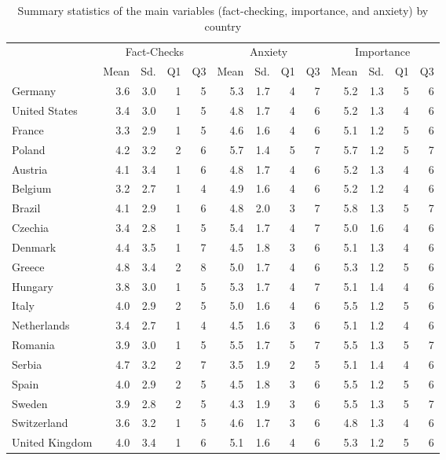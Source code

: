 \begin{table}[ht]
\centering
\begin{tabular}{lrrrrrrrrrrrr}
  \hline
  & \multicolumn{4}{c}{Fact-Checks}& \multicolumn{4}{c}{Anxiety}& \multicolumn{4}{c}{Importance}\\ & Mean & Sd. & Q1 & Q3 & Mean & Sd. & Q1 & Q3 & Mean & Sd. & Q1 & Q3 \\ \hline
Germany & 3.6 & 3.0 & 1 & 5 & 5.3 & 1.7 & 4 & 7 & 5.2 & 1.3 & 5 & 6 \\ 
  United States & 3.4 & 3.0 & 1 & 5 & 4.8 & 1.7 & 4 & 6 & 5.2 & 1.3 & 4 & 6 \\ 
  France & 3.3 & 2.9 & 1 & 5 & 4.6 & 1.6 & 4 & 6 & 5.1 & 1.2 & 5 & 6 \\ 
  Poland & 4.2 & 3.2 & 2 & 6 & 5.7 & 1.4 & 5 & 7 & 5.7 & 1.2 & 5 & 7 \\ 
  Austria & 4.1 & 3.4 & 1 & 6 & 4.8 & 1.7 & 4 & 6 & 5.2 & 1.3 & 4 & 6 \\ 
  Belgium & 3.2 & 2.7 & 1 & 4 & 4.9 & 1.6 & 4 & 6 & 5.2 & 1.2 & 4 & 6 \\ 
  Brazil & 4.1 & 2.9 & 1 & 6 & 4.8 & 2.0 & 3 & 7 & 5.8 & 1.3 & 5 & 7 \\ 
  Czechia & 3.4 & 2.8 & 1 & 5 & 5.4 & 1.7 & 4 & 7 & 5.0 & 1.6 & 4 & 6 \\ 
  Denmark & 4.4 & 3.5 & 1 & 7 & 4.5 & 1.8 & 3 & 6 & 5.1 & 1.3 & 4 & 6 \\ 
  Greece & 4.8 & 3.4 & 2 & 8 & 5.0 & 1.7 & 4 & 6 & 5.3 & 1.2 & 5 & 6 \\ 
  Hungary & 3.8 & 3.0 & 1 & 5 & 5.3 & 1.7 & 4 & 7 & 5.1 & 1.4 & 4 & 6 \\ 
  Italy & 4.0 & 2.9 & 2 & 5 & 5.0 & 1.6 & 4 & 6 & 5.5 & 1.2 & 5 & 6 \\ 
  Netherlands & 3.4 & 2.7 & 1 & 4 & 4.5 & 1.6 & 3 & 6 & 5.1 & 1.2 & 4 & 6 \\ 
  Romania & 3.9 & 3.0 & 1 & 5 & 5.5 & 1.7 & 5 & 7 & 5.5 & 1.3 & 5 & 7 \\ 
  Serbia & 4.7 & 3.2 & 2 & 7 & 3.5 & 1.9 & 2 & 5 & 5.1 & 1.4 & 4 & 6 \\ 
  Spain & 4.0 & 2.9 & 2 & 5 & 4.5 & 1.8 & 3 & 6 & 5.5 & 1.2 & 5 & 6 \\ 
  Sweden & 3.9 & 2.8 & 2 & 5 & 4.3 & 1.9 & 3 & 6 & 5.5 & 1.3 & 5 & 7 \\ 
  Switzerland & 3.6 & 3.2 & 1 & 5 & 4.6 & 1.7 & 3 & 6 & 4.8 & 1.3 & 4 & 6 \\ 
  United Kingdom & 4.0 & 3.4 & 1 & 6 & 5.1 & 1.6 & 4 & 6 & 5.3 & 1.2 & 5 & 6 \\ 
   \hline
\end{tabular}
\caption{Summary statistics of the main variables (fact-checking, importance, and anxiety) by country} 
\label{sumstats::vars}
\end{table}
